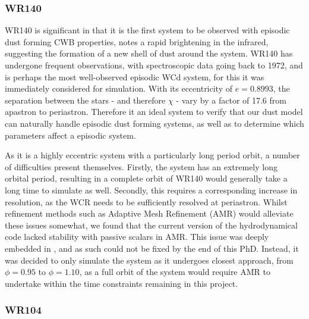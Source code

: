 \subsubsection{WR140}

WR140 is significant in that it is the first system to be observed with episodic dust forming CWB properties, \textcite{williamsCondensationShellHD1978} notes a rapid brightening in the infrared, suggesting the formation of a new shell of dust around the system.
WR140 has undergone frequent observations, with spectroscopic data going back to 1972, and is perhaps the most well-observed episodic WCd system, for this it was immediately considered for simulation.
With its eccentricity of $e=0.8993$, the separation between the stars - and therefore $\chi$ - vary by a factor of 17.6 from apastron to periastron.
Therefore it an ideal system to verify that our dust model can naturally handle episodic dust forming systems, as well as to determine which parameters affect a episodic system.

As it is a highly eccentric system with a particularly long period orbit, a number of difficulties present themselves.
Firstly, the system has an extremely long orbital period, resulting in a complete orbit of WR140 would generally take a long time to simulate as well.
Secondly, this requires a corresponding increase in resolution, as the WCR needs to be sufficiently resolved at periastron.
Whilst refinement methods such as Adaptive Mesh Refinement (AMR) would alleviate these issues somewhat, we found that the current version of the \athena{} hydrodynamical code lacked stability with passive scalars in AMR.
This issue was deeply embedded in \athena{}, and as such could not be fixed by the end of this PhD.
Instead, it was decided to only simulate the system as it undergoes closest approach, from $\phi = 0.95$ to $\phi = 1.10$, as a full orbit of the system would require AMR to undertake within the time constraints remaining in this project. 

\subsubsection{WR104}

